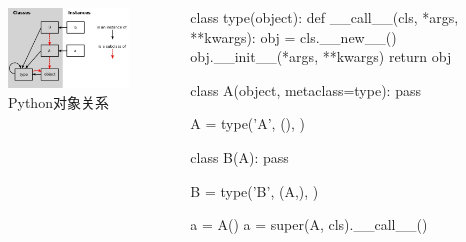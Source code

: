 \begin{frame}[fragile]
    \begin{columns}
        \begin{column}{.4\textwidth}
            \begin{figure}[!tb]
                \includegraphics[width=\twopicwidth]{figure/var/metaclass}
                \caption{Python对象关系\footnotemark}
            \end{figure}
        \end{column}

        \begin{column}{.5\textwidth}
            \begin{tcblisting}{}
                class type(object):
                  def __call__(cls, *args, **kwargs):
                    obj = cls.__new__()
                    obj.__init__(*args, **kwargs)
                    return obj

                class A(object, metaclass=type):
                  pass

                A = type('A', (), {})

                class B(A):
                  pass

                B = type('B', (A,), {})

                a = A()
                a = super(A, cls).__call__()
            \end{tcblisting}
        \end{column}
    \end{columns}

\end{frame}


